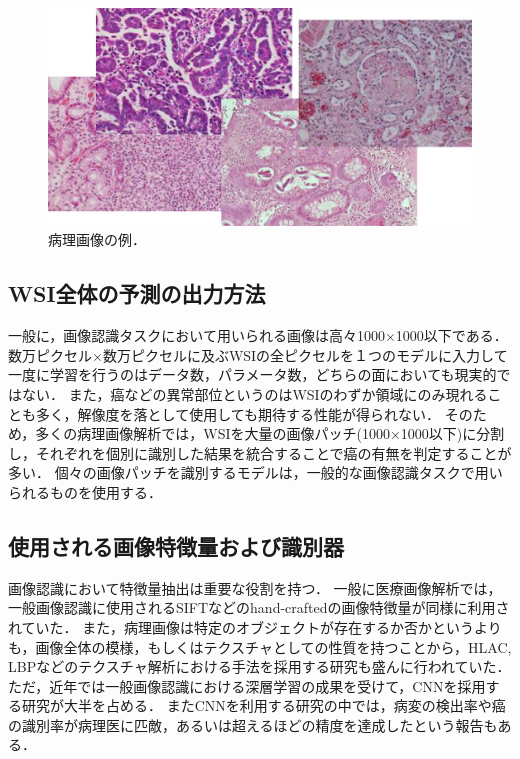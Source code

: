 \begin{figure}[tbp]
    \label{fig:path_images}
     \begin{center}
      \includegraphics[width=13cm]{figures/path_images.pdf}
     \end{center}
    \caption{病理画像の例．}
\end{figure}
    
\subsection{WSI全体の予測の出力方法}
一般に，画像認識タスクにおいて用いられる画像は高々1000×1000以下である．
数万ピクセル×数万ピクセルに及ぶWSIの全ピクセルを１つのモデルに入力して一度に学習を行うのはデータ数，パラメータ数，どちらの面においても現実的ではない．
また，癌などの異常部位というのはWSIのわずか領域にのみ現れることも多く，解像度を落として使用しても期待する性能が得られない．
そのため，多くの病理画像解析では，WSIを大量の画像パッチ(1000×1000以下)に分割し，それぞれを個別に識別した結果を統合することで癌の有無を判定することが多い．
個々の画像パッチを識別するモデルは，一般的な画像認識タスクで用いられるものを使用する．

\subsection{使用される画像特徴量および識別器}
画像認識において特徴量抽出は重要な役割を持つ．
一般に医療画像解析では，一般画像認識に使用されるSIFTなどのhand-craftedの画像特徴量が同様に利用されていた\cite{caicedo2009histopathology}．
また，病理画像は特定のオブジェクトが存在するか否かというよりも，画像全体の模様，もしくはテクスチャとしての性質を持つことから，HLAC, LBPなどのテクスチャ解析における手法を採用する研究も盛んに行われていた\cite{sertel2008texture, sertel2009histopathological, nosato2011extended}．
ただ，近年では一般画像認識における深層学習の成果を受けて，CNNを採用する研究が大半を占める\cite{hou2016patch, xu2016deep, litjens2016deep, chen2016dcan, liu2017detecting}．
またCNNを利用する研究の中では，病変の検出率\cite{liu2017detecting}や癌の識別率\cite{xu2016deep}が病理医に匹敵，あるいは超えるほどの精度を達成したという報告もある．

